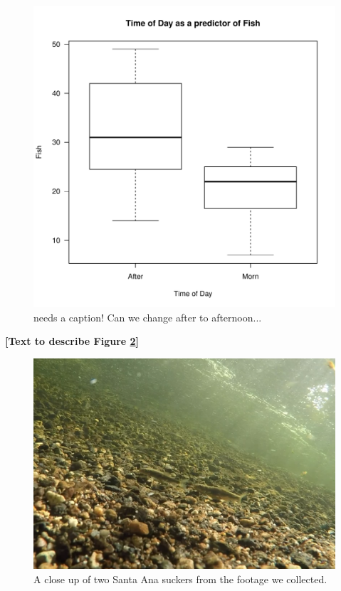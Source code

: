 \documentclass{article}\usepackage[]{graphicx}\usepackage[]{color}
\makeatletter
\def\maxwidth{ %
  \ifdim\Gin@nat@width>\linewidth
    \linewidth
  \else
    \Gin@nat@width
  \fi
}
\newenvironment{knitrout}{}{} %
\makeatother
\begin{document}
\begin{figure}[!ht]
\begin{knitrout}
\color{fgcolor}
\includegraphics[width=\maxwidth]{figure/unnamed-chunk-7-1} 

\end{knitrout}
\caption{needs a caption! Can we change after to afternoon...}
\label{fig:fishsection}
\end{figure}


\textbf{[Text to describe Figure \ref{fig:reallygoodcrop}]}

\begin{figure}
\includegraphics[scale=.4]{Videography_figures/reallygoodcrop}
\caption{A close up of two Santa Ana suckers from the footage we collected.}
\label{fig:reallygoodcrop}
\end{figure}
\end{document}
